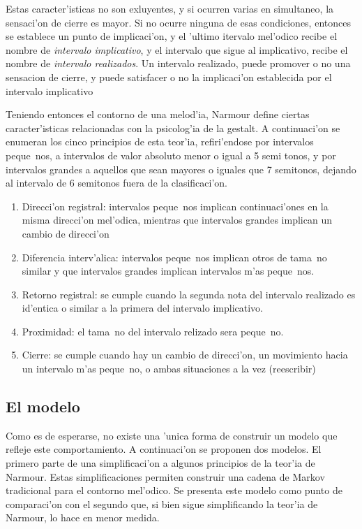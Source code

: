 Estas caracter'isticas no son exluyentes, y si ocurren varias en simultaneo, la sensaci'on de cierre es mayor. 
Si no ocurre ninguna de esas condiciones, entonces se establece un punto de implicaci'on, y el 'ultimo itervalo mel'odico recibe el nombre
de \emph{intervalo implicativo}, y el intervalo que sigue al implicativo, recibe el nombre de \emph{intervalo realizados}. 
Un intervalo realizado, puede promover o no una sensacion de cierre, y puede satisfacer o no la implicaci'on establecida por el intervalo 
implicativo
 
Teniendo entonces el contorno de una melod'ia, Narmour define ciertas caracter'isticas relacionadas con la psicolog'ia de la gestalt. A continuaci'on 
se enumeran los cinco principios de esta teor'ia, refiri'endose por intervalos peque~nos, a intervalos de valor absoluto menor o igual a 5 semi tonos, y por intervalos
grandes a aquellos que sean mayores o iguales que 7 semitonos, dejando al intervalo de 6 semitonos fuera de la clasificaci'on.
\begin{enumerate}
 \item Direcci'on registral: intervalos peque~nos implican continuaci'ones en la misma direcci'on mel'odica, mientras que intervalos grandes implican un cambio de direcci'on
 \item Diferencia interv'alica: intervalos peque~nos implican otros de tama~no similar y que intervalos grandes implican intervalos m'as peque~nos. 
 \item Retorno registral: se cumple cuando la segunda nota del intervalo realizado es id'entica o similar a la primera del intervalo implicativo.
 \item Proximidad: el tama~no del intervalo relizado sera peque~no.
 \item Cierre: se cumple cuando hay un cambio de direcci'on, un movimiento hacia un intervalo m'as peque~no, o ambas situaciones a la vez (\alert{reescribir})
\end{enumerate}

\subsection{El modelo}
Como es de esperarse, no existe una 'unica forma de construir un modelo que refleje este comportamiento. A continuaci'on se proponen dos modelos. El primero 
parte de una simplificaci'on a algunos principios de la teor'ia de Narmour. Estas simplificaciones permiten construir una cadena de Markov tradicional para el contorno 
mel'odico. Se presenta este modelo como punto de comparaci'on con el segundo que, si bien sigue simplificando la teor'ia de Narmour, lo hace en menor medida. 

